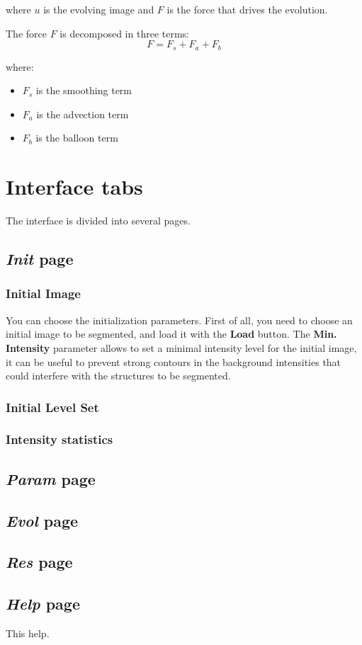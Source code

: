 \documentclass{article}
\begin{document}
where $u$ is the evolving image and $F$ is the force that drives the evolution.

The force $F$ is decomposed in three terms:
\begin{equation} \label{eq:LS_terms}
    F = F_s + F_a + F_b 
\end{equation}

where:
\begin{itemize}
   \item $F_s$ is the smoothing term
   \item $F_a$ is the advection term
   \item $F_b$ is the balloon term 
\end{itemize}


\section{Interface tabs}

The interface is divided into several pages.

\subsection{\emph{Init} page}

\subsubsection{Initial Image}
You can choose the initialization parameters.
First of all, you need to choose an initial image to be segmented, and load it with the {\bf Load} button.
The {\bf Min. Intensity} parameter allows to set a minimal intensity level for the initial image, it can be useful to prevent strong contours in the background intensities that could interfere with the structures to be segmented.


\subsubsection{Initial Level Set}

\subsubsection{Intensity statistics}

\subsection{\emph{Param} page}

\subsection{\emph{Evol} page}

\subsection{\emph{Res} page}

\subsection{\emph{Help} page}
This help.



\end{document}
